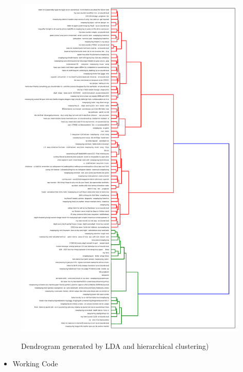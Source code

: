 \documentclass[10pt]{article}
\begin{document}
\begin{figure}[H]
	\caption{Dendrogram generated by LDA and hierarchical clustering)}
	\centering
	\includegraphics[scale=0.5]{clusters.png}
	\label{fig2}
\end{figure}

\begin{itemize}
	\item Working Code
\end{itemize}
\end{document}
